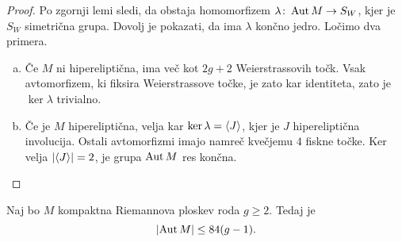 \begin{proof}
Po zgornji lemi sledi, da obstaja homomorfizem
$\lambda \colon \operatorname{Aut} M \to S_W$, kjer je $S_W$ simetrična grupa.
Dovolj je pokazati, da ima $\lambda$ končno jedro. Ločimo dva
primera.

\begin{enumerate}[a)]
\item Če $M$ ni hipereliptična, ima več kot $2g + 2$
Weierstrassovih točk. Vsak avtomorfizem, ki fiksira Weierstrassove
točke, je zato kar identiteta, zato je $\ker \lambda$ trivialno.

\item Če je $M$ hipereliptična, velja kar
$\ker \lambda = \left\langle J\right\rangle$, kjer je $J$ hipereliptična involucija.
Ostali avtomorfizmi imajo namreč kvečjemu $4$ fiskne točke. Ker
velja $\left\lvert \left\langle J\right\rangle\right\rvert = 2$, je grupa $\operatorname{Aut} M$ res končna. \qedhere
\end{enumerate}
\end{proof}

\begin{izrek}[Hurwitz]
Naj bo $M$ kompaktna Riemannova ploskev roda $g \geq 2$. Tedaj je
\[
\left\lvert \operatorname{Aut} M\right\rvert \leq 84(g-1).
\]
\end{izrek}

